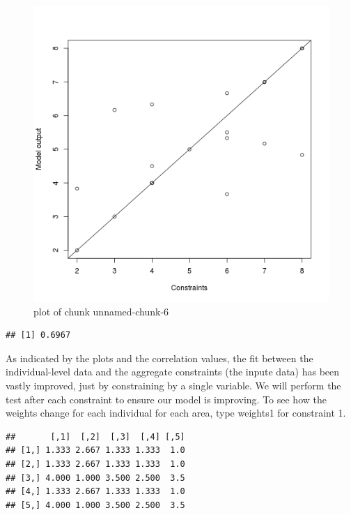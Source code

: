 \begin{figure}[htbp]
\centering
\includegraphics{figure/unnamed-chunk-6.png}
\caption{plot of chunk unnamed-chunk-6}
\end{figure}

\begin{Shaded}
\begin{Highlighting}[]
\NormalTok{(}\NormalTok{(}\NormalTok{(}
\end{Highlighting}
\end{Shaded}
\begin{verbatim}
## [1] 0.6967
\end{verbatim}
As indicated by the plots and the correlation values, the fit between
the individual-level data and the aggregate constraints (the inpute
data) has been vastly improved, just by constraining by a single
variable. We will perform the test after each constraint to ensure our
model is improving. To see how the weights change for each individual
for each area, type weights1 for constraint 1.

\begin{Shaded}
\begin{Highlighting}[]
\end{Highlighting}
\end{Shaded}
\begin{verbatim}
##       [,1]  [,2]  [,3]  [,4] [,5]
## [1,] 1.333 2.667 1.333 1.333  1.0
## [2,] 1.333 2.667 1.333 1.333  1.0
## [3,] 4.000 1.000 3.500 2.500  3.5
## [4,] 1.333 2.667 1.333 1.333  1.0
## [5,] 4.000 1.000 3.500 2.500  3.5
\end{verbatim}
